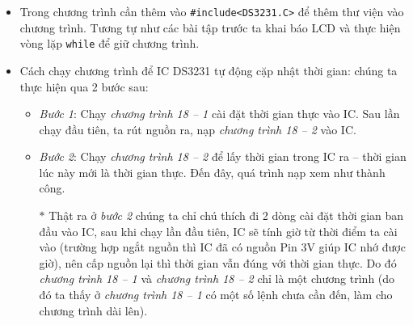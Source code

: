 \begin{itemize}
\begin{itemize}
\begin{itemize}
\begin{table}[!h]
\begin{center}
\begin{tabular}{|c|l|c|l|}
\end{tabular}
\end{center}
\caption{Giải thích các tham số cài đặt thời gian thực cho IC DS3231}\label{Tab:set-DS3231}
\end{table}
\item Đọc thời gian trong \verb|IC| ra, ta dùng 2 hàm sau:
\begin{verbatim}
       getTime(hr, min, s, am_pm, hr_format);
       getDate(dy, dt, mt, yr);
\end{verbatim}
Với các tham số kết quả ra tùy thuộc vào cách ta đã cài đặt tham số đầu vào theo định nghĩa trong \textit{bảng \ref{Tab:set-DS3231}}.
\end{itemize}
\item Do ta truyền tham số vào ở dạng số, nên muốn hiển thị thứ hoặc giờ \verb|am| hay giờ \verb|pm| thì ta có thể kết hợp với cấu trúc \verb|switch - case| để lựa chọn giá trị xuất ra.
\end{itemize}
\item Trong chương trình cần thêm vào \verb|#include<DS3231.C>| để thêm thư viện vào chương trình. Tương tự như các bài tập trước ta khai báo LCD và thực hiện vòng lặp \verb|while| để giữ chương trình.
\item Cách chạy chương trình để IC DS3231 tự động cặp nhật thời gian: chúng ta thực hiện qua 2 bước sau:
\begin{itemize}
\item \textit{Bước 1}: Chạy \textit{chương trình 18 -- 1} cài đặt thời gian thực vào IC. Sau lần chạy đầu tiên, ta rút nguồn ra, nạp \textit{chương trình 18 -- 2} vào IC.
\item \textit{Bước 2}: Chạy \textit{chương trình 18 -- 2} để lấy thời gian trong IC ra -- thời gian lúc này mới là thời gian thực. Đến đây, quá trình nạp xem như thành công.
\item[$\ast$] Thật ra ở \textit{bước 2} chúng ta chỉ chú thích đi 2 dòng cài đặt thời gian ban đầu vào IC, sau khi chạy lần đầu tiên, IC sẽ tính giờ từ thời điểm ta cài vào (trường hợp ngắt nguồn thì IC đã có nguồn Pin 3V giúp IC nhớ được giờ), nên cấp nguồn lại thì thời gian vẫn đúng với thời gian thực. Do đó \textit{chương trình 18 -- 1} và \textit{chương trình 18 -- 2} chỉ là một chương trình (do đó ta thấy ở \textit{chương trình 18 -- 1} có một số lệnh chưa cần đến, làm cho chương trình dài lên).
\end{itemize}
\end{itemize}
